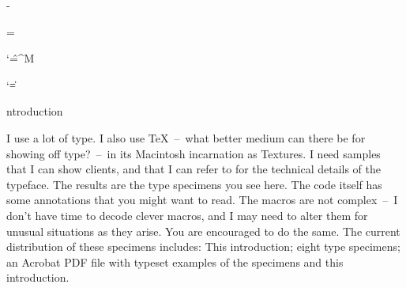 \advance\hoffset-\hsize
\divide{}

\def\ob{\tt\string{}
\def\cb{\tt\string}}

\footline={\ifnum{} \else \hss\folio\hss\fi}

\chardef{}
\def\deactivate{%
\catcode`\\=\other \catcode`\{=\other
\catcode`\}=\other \catcode`\$=\other
\catcode`\&=\other \catcode`\#=\other
\catcode`\%=\other \catcode`\~=\other
\catcode`\^=\other \catcode`\_=\other}

\def\makeactive#1{\catcode`#1=\active \ignorespaces}

\def\LaTeX{L\kern-.26em \raise.6ex\hbox{\fivei A}%
\kern-.15em TeX}%

{\makeactive\^^M %
\gdef\obeywhitespace{\makeactive\^^M %
\let^^M=\newline %
\aftergroup\removebox %
\obeyspaces}}

\def\newline{\par\indent}
\def\removebox{\setbox0=\lastbox}

{\catcode`\|=\active
\gdef\verbatim{%
		\par\begingroup\deactivate\obeywhitespace\tt
		\catcode`\|=\active
		\def|{\endgroup\par}}}

\raggedbottom
{}

\def\section#1\par{%
\medskip
\noindent{}\par\nobreak\noindent}

\section Introduction

I use a lot of type. I also use \TeX~--~what better medium can there be for showing off type?~--~in
its Macintosh incarnation as Textures. I need samples that I can show clients, and that I can
refer to for the technical details of the typeface. The results are the type specimens you see
here. The code itself has some annotations that you might want to read. The macros are not
complex~--~I don't have time to decode clever macros, and I may need to alter them for unusual
situations as they arise. You are encouraged to do the same. The current distribution of these
specimens includes: This introduction; eight type specimens; an Acrobat PDF file with typeset 
examples of the specimens and this introduction.

